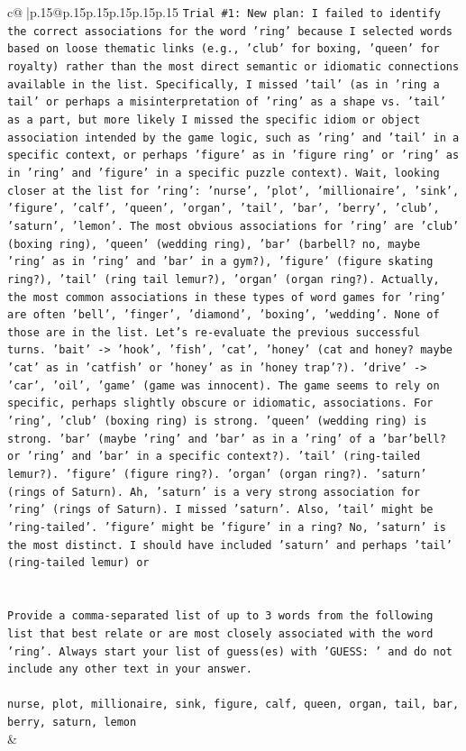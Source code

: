 \documentclass{article}
\begin{document}
{\begin{supertabular}{c@{$\;$}|p{.15\linewidth}@{}p{.15\linewidth}p{.15\linewidth}p{.15\linewidth}p{.15\linewidth}p{.15\linewidth}}
{{{\texttt{Trial \#1: New plan: I failed to identify the correct associations for the word 'ring' because I selected words based on loose thematic links (e.g., 'club' for boxing, 'queen' for royalty) rather than the most direct semantic or idiomatic connections available in the list. Specifically, I missed 'tail' (as in 'ring a tail' or perhaps a misinterpretation of 'ring' as a shape vs. 'tail' as a part, but more likely I missed the specific idiom or object association intended by the game logic, such as 'ring' and 'tail' in a specific context, or perhaps 'figure' as in 'figure ring' or 'ring' as in 'ring' and 'figure' in a specific puzzle context). Wait, looking closer at the list for 'ring': 'nurse', 'plot', 'millionaire', 'sink', 'figure', 'calf', 'queen', 'organ', 'tail', 'bar', 'berry', 'club', 'saturn', 'lemon'. The most obvious associations for 'ring' are 'club' (boxing ring), 'queen' (wedding ring), 'bar' (barbell? no, maybe 'ring' as in 'ring' and 'bar' in a gym?), 'figure' (figure skating ring?), 'tail' (ring tail lemur?), 'organ' (organ ring?). Actually, the most common associations in these types of word games for 'ring' are often 'bell', 'finger', 'diamond', 'boxing', 'wedding'. None of those are in the list. Let's re{-}evaluate the previous successful turns. 'bait' {-}> 'hook', 'fish', 'cat', 'honey' (cat and honey? maybe 'cat' as in 'catfish' or 'honey' as in 'honey trap'?). 'drive' {-}> 'car', 'oil', 'game' (game was innocent). The game seems to rely on specific, perhaps slightly obscure or idiomatic, associations. For 'ring', 'club' (boxing ring) is strong. 'queen' (wedding ring) is strong. 'bar' (maybe 'ring' and 'bar' as in a 'ring' of a 'bar'bell? or 'ring' and 'bar' in a specific context?). 'tail' (ring{-}tailed lemur?). 'figure' (figure ring?). 'organ' (organ ring?). 'saturn' (rings of Saturn). Ah, 'saturn' is a very strong association for 'ring' (rings of Saturn). I missed 'saturn'. Also, 'tail' might be 'ring{-}tailed'. 'figure' might be 'figure' in a ring? No, 'saturn' is the most distinct. I should have included 'saturn' and perhaps 'tail' (ring{-}tailed lemur) or} \\
\\ 
\\ 
\texttt{Provide a comma{-}separated list of up to 3 words from the following list that best relate or are most closely associated with the word 'ring'. Always start your list of guess(es) with 'GUESS: ' and do not include any other text in your answer.} \\
\\ 
\texttt{nurse, plot, millionaire, sink, figure, calf, queen, organ, tail, bar, berry, saturn, lemon} \\
            }
        }
    }
    & \\ \\


\end{supertabular}}
\end{document}
